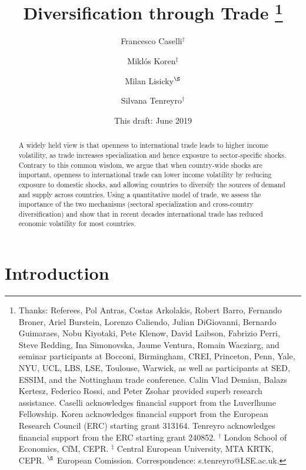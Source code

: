 \documentclass[12pt]{article}
\begin{document}
\title{Diversification through Trade \thanks{%
Thanks: Referees, Pol Antras, Costas Arkolakis, Robert Barro, Fernando
Broner, Ariel Burstein, Lorenzo Caliendo, Julian DiGiovanni, Bernardo
Guimaraes, Nobu Kiyotaki, Pete Klenow, David Laibson, Fabrizio Perri, Steve
Redding, Ina Simonovska, Jaume Ventura, Romain Wacziarg, and seminar
participants at Bocconi, Birmingham, CREI, Princeton, Penn, Yale, NYU, UCL,
LBS, LSE, Toulouse, Warwick, as well as participants at SED, ESSIM, and the
Nottingham trade conference. Calin Vlad Demian, Balazs Kertesz, Federico
Rossi, and Peter Zsohar provided superb research assistance. Caselli
acknowledges financial support from the Luverlhume Fellowship. Koren
acknowledges financial support from the European Research Council (ERC)
starting grant 313164. Tenreyro acknowledges financial support from the ERC
starting grant 240852. \newline
$^{\dag }$ London School of Economics, CfM, CEPR. $^{\ddag }$ Central
European University, MTA KRTK, CEPR. $^{\S }$ European Comission.
Correspondence: s.tenreyro@LSE.ac.uk.} }
\author{Francesco Caselli$^{\dag }$ \and Mikl\'os Koren$^{\ddag }$ \and Milan
Lisicky$^{\S }$ \and Silvana Tenreyro$^{\dag }$}
\date{This draft: June 2019}
\maketitle

\begin{abstract}
A widely held view is that openness to international trade leads to higher
income volatility, as trade increases specialization and hence exposure to
sector-specific shocks. Contrary to this common wisdom, we argue that when
country-wide shocks are important, openness to international trade can lower
income volatility by reducing exposure to domestic shocks, and allowing
countries to diversify the sources of demand and supply across countries.
Using a quantitative model of trade, we assess the importance of the two
mechanisms (sectoral specialization and cross-country diversification) and
show that in recent decades international trade has reduced economic
volatility for most countries.
\end{abstract}

\section{Introduction}
\end{document}
